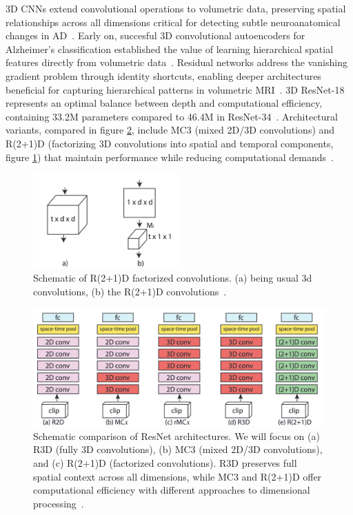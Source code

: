 \documentclass[12pt, a4paper]{article}
\begin{document}
3D CNNs extend convolutional operations to volumetric data, preserving spatial relationships across all dimensions critical for detecting subtle neuroanatomical changes in AD~\cite{ebrahimi2020introducing}. Early on, succesful 3D convolutional autoencoders for Alzheimer's classification established the value of learning hierarchical spatial features directly from volumetric data~\cite{payan2015predicting}. Residual networks address the vanishing gradient problem through identity shortcuts, enabling deeper architectures beneficial for capturing hierarchical patterns in volumetric MRI~\cite{wu20223d}. 3D ResNet-18 represents an optimal balance between depth and computational efficiency, containing 33.2M parameters compared to 46.4M in ResNet-34~\cite{ebrahimi2020introducing}. Architectural variants, compared in figure \ref{fig:cnn_architectures}, include MC3 (mixed 2D/3D convolutions) and R(2+1)D (factorizing 3D convolutions into spatial and temporal components, figure \ref{fig:2plus1D}) that maintain performance while reducing computational demands~\cite{wu20223d}.

\begin{figure}[htbp]
  \centering
  \includegraphics[width=0.5\textwidth]{figures/2plus1d.png}
  \caption{Schematic of R(2+1)D factorized convolutions. (a) being usual 3d convolutions, (b) the R(2+1)D convolutions~\cite{tran2018closer}.}
  \label{fig:2plus1D}
\end{figure}

\begin{figure}[htbp]
  \centering
  \includegraphics[width=\textwidth]{figures/res_net_archs.png}
  \caption{Schematic comparison of ResNet architectures. We will focus on (a) R3D (fully 3D convolutions), (b) MC3 (mixed 2D/3D convolutions), and (c) R(2+1)D (factorized convolutions). R3D preserves full spatial context across all dimensions, while MC3 and R(2+1)D offer computational efficiency with different approaches to dimensional processing~\cite{tran2018closer}.}
  \label{fig:cnn_architectures}
\end{figure}
\end{document}
